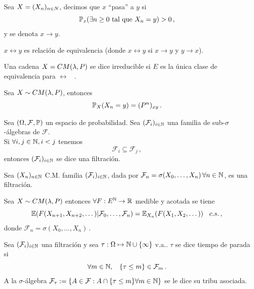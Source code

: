 \begin{definition}[$x$ ``pasa'' a $y$]
Sea $X=\xcm$, decimos que $x$ ``pasa'' a $y$ si
$$\P_x(\exists n\geq 0 \tq X_n=y)>0 \, ,$$
y se denota $x\longrightarrow y$.
\end{definition}
\begin{remark}
$x\longleftrightarrow y$ es relación de equivalencia (donde $x\longleftrightarrow y$ si $x\longrightarrow y$ y $y\longrightarrow x$).
\end{remark}
\begin{definition}
Una cadena $X=\cm$ se dice irreducible si $E$ es la única clase de equivalencia para $\longleftrightarrow$ \, .
\end{definition}
\begin{property}[de Semigrupo]
Sea $X\sim\cm$, entonces $$ \P_X(X_n=y)=(P^n)_{xy} \, .$$
\end{property}
\begin{definition}[Filtración]
Sea $\edp$ un espacio de probabilidad. Sea $(\mathcal{F}_i)_{i\in\N}$ una familia de sub-$\sigma$-álgebras de $\mathcal{F}$. \\ Si $\forall i,j\in\N, i<j$ tenemos $$\mathcal{F}_i\subseteq\mathcal{F}_j \, ,$$
entonces $(\mathcal{F}_i)_{i\in\N}$ se dice una filtración.
\end{definition}
\begin{remark}
Sea $(X_n)_{n\in\N}$ C.M. familia $(\mathcal{F}_i)_{i\in\N}$, dada por $\mathcal{F}_n=\sigma(X_0,\dots,X_n)\, \forall n\in\N$, es una filtración.
\end{remark}
\begin{theorem}
Sea $X\sim\cm$ entonces $\forall F:E^\N \to \R$ medible y acotada se tiene
$$ \E(F(X_{n+1},X_{n+2},\dots)|\mathcal{F}_0,\dots,\mathcal{F}_n)=\E_{X_n}(F(X_1,X_2,\dots)) \espacio c.s.\, ,$$
donde $\mathcal{F}_n=\sigma(X_0,\dots,X_n)$\,.
\end{theorem}
\begin{definition}
Sea $(\mathcal{F}_i)_{i\in\N}$ una filtración y sea $\tau:\Omega\mapsto\N\cup\{\infty\}$ v.a.. $\tau$ se dice tiempo de parada si
$$\forall m\in\N,\espacio \{\tau\leq m\}\in\mathcal{F}_m \, .$$
\newline A la $\sigma$-álgebra $\mathcal{F}_\tau:=\{A\in\mathcal{F}:A\cap\{\tau\leq m\}\forall m \in \N\}$ se le dice su tribu asociada.
\end{definition}
